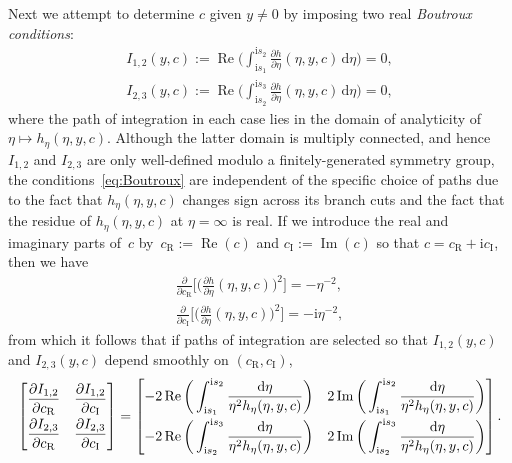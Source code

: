 \documentclass[11pt]{article}
\numberwithin{equation}{section}
\numberwithin{equation}{section}
\begin{document}
Next we attempt to determine $c$ given $y\neq 0$ by imposing two real \emph{Boutroux conditions}:
\begin{gather}
I_{1,2}(y,c):=\operatorname{Re}\bigg(\int_{\mathrm{i} s_1}^{\mathrm{i} s_2}\frac{\partial h}{\partial \eta}(\eta,y,c)\,\mathrm{d}\eta\bigg)=0,\nonumber\\
I_{2,3}(y,c):=\operatorname{Re}\bigg(\int_{\mathrm{i} s_2}^{\mathrm{i} s_3}\frac{\partial h}{\partial\eta}(\eta,y,c)\,\mathrm{d}\eta\bigg)=0,
\label{eq:Boutroux}
\end{gather}
where the path of integration in each case lies in the domain of analyticity of $\eta\mapsto h_\eta(\eta,y,c)$. Although the latter domain is multiply connected, and hence $I_{1,2}$ and $I_{2,3}$ are only well-defined modulo a finitely-generated symmetry group, the conditions~\eqref{eq:Boutroux} are independent of the specific choice of paths due to the fact that $h_\eta(\eta,y,c)$ changes sign across its branch cuts and the fact that the residue of $h_\eta(\eta,y,c)$ at $\eta=\infty$ is real. If we introduce the real and imaginary parts of~$c$ by~$c_\mathrm{R}:=\operatorname{Re}(c)$ and $c_\mathrm{I}:=\operatorname{Im}(c)$ so that $c=c_\mathrm{R}+\mathrm{i} c_\mathrm{I}$, then we have
\begin{gather*}
\frac{\partial}{\partial c_\mathrm{R}}\bigg[\bigg(\frac{\partial h}{\partial\eta}(\eta,y,c)\bigg)^2\bigg] = -\eta^{-2},\\
\frac{\partial}{\partial c_\mathrm{I}}\bigg[\bigg(\frac{\partial h}{\partial\eta}(\eta,y,c)\bigg)^2\bigg] = -\mathrm{i}\eta^{-2},
\end{gather*}
from which it follows that if paths of integration are selected so that $I_{1,2}(y,c)$ and $I_{2,3}(y,c)$ depend smoothly on $(c_\mathrm{R},c_\mathrm{I})$,
\begin{equation*}
\begin{bmatrix}
\dfrac{\partial I_{1,2}}{\partial c_\mathrm{R}} & \dfrac{\partial I_{1,2}}{\partial c_\mathrm{I}}\vspace{1mm}\\
\dfrac{\partial I_{2,3}}{\partial c_\mathrm{R}} & \dfrac{\partial I_{2,3}}{\partial c_\mathrm{I}}
\end{bmatrix} =
\begin{bmatrix}
\displaystyle
-2\operatorname{Re}\bigg(\int_{\mathrm{i} s_1}^{\mathrm{i} s_2}\frac{\mathrm{d}\eta}{\eta^2h_\eta(\eta,y,c)}\bigg) & \displaystyle 2\operatorname{Im}\bigg(\int_{\mathrm{i} s_1}^{\mathrm{i} s_2}\frac{\mathrm{d}\eta}{\eta^2h_\eta(\eta,y,c)}\bigg)\vspace{1mm}\\
\displaystyle
-2\operatorname{Re}\bigg(\int_{\mathrm{i} s_2}^{\mathrm{i} s_3}\frac{\mathrm{d}\eta}{\eta^2h_\eta(\eta,y,c)}\bigg) & \displaystyle 2\operatorname{Im}\bigg(\int_{\mathrm{i} s_2}^{\mathrm{i} s_3}\frac{\mathrm{d}\eta}{\eta^2h_\eta(\eta,y,c)}\bigg)
\end{bmatrix}.
\end{equation*}
\end{document}
